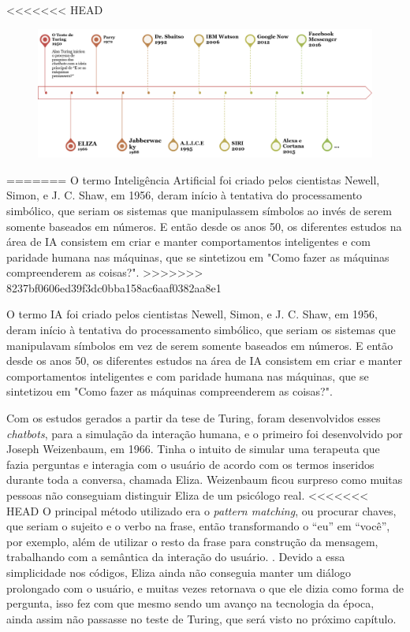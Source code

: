 \documentclass[
	12pt,				%
	oneside,
	a4paper,			%
	english,			%
	french,				%
	spanish,			%
	brazil				%
	]{abntex2}
\begin{document}
<<<<<<< HEAD
\begin{figure}[h]
\centering %
\includegraphics[width=15cm]{linhahistchatbots.png} %
\label{figura:Linha histórica dos chatbots}
\end{figure}
=======
O termo Inteligência Artificial foi criado pelos cientistas Newell, Simon, e J. C. Shaw, em 1956, deram início à tentativa do processamento simbólico, que seriam os sistemas que manipulassem símbolos ao invés de serem somente baseados em números.
E então desde os anos 50, os diferentes estudos na área de IA consistem em criar e manter comportamentos inteligentes e com paridade humana nas máquinas, que se sintetizou em "Como fazer as máquinas compreenderem as coisas?"\cite{minsky}.
>>>>>>> 8237bf0606ed39f3dc0bba158ac6aaf0382aa8e1

O termo IA foi criado pelos cientistas Newell, Simon, e J. C. Shaw, em 1956, deram início à tentativa do processamento simbólico, que seriam os sistemas que manipulavam símbolos em vez de serem somente baseados em números.
E então desde os anos 50, os diferentes estudos na área de IA consistem em criar e manter comportamentos inteligentes e com paridade humana nas máquinas, que se sintetizou em "Como fazer as máquinas compreenderem as coisas?"\cite{minsky}.

Com os estudos gerados a partir da tese de Turing, foram desenvolvidos esses \emph{chatbots}, para a simulação da interação humana, e o primeiro foi desenvolvido por Joseph Weizenbaum, em 1966. Tinha o intuito de simular uma terapeuta que fazia perguntas e interagia com o usuário de acordo com os termos inseridos durante toda a conversa, chamada Eliza.
Weizenbaum ficou surpreso como muitas pessoas não conseguiam distinguir Eliza de um psicólogo real. 
<<<<<<< HEAD
O principal método utilizado era o \emph{pattern matching}, ou procurar chaves, que seriam o sujeito e o verbo na frase, então transformando o “eu” em “você”, por exemplo, além de utilizar o resto da frase para construção da mensagem, trabalhando com a semântica da interação do usuário. \cite{weizenbaum-eliza}. Devido a essa simplicidade nos códigos, Eliza ainda não conseguia manter um diálogo prolongado com o usuário, e muitas vezes retornava o que ele dizia como forma de pergunta, isso fez com que mesmo sendo um avanço na tecnologia da época, ainda assim não passasse no teste de Turing, que será visto no próximo capítulo.
\end{document}
